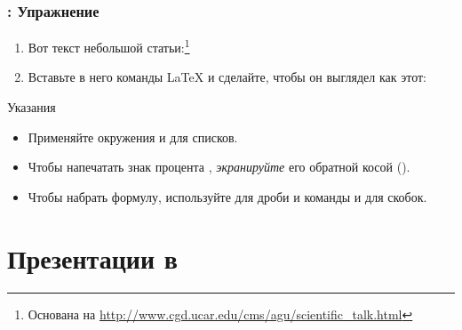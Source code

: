 \documentclass[usenames,dvipsnames]{beamer}
\begin{document}
\begin{frame}[fragile]
\frametitle{\insertsection: Упражнение}
\vspace{-3ex}
\begin{enumerate}
\item Вот текст небольшой статьи:\footnote{Основана на \url{http://www.cgd.ucar.edu/cms/agu/scientific_talk.html}}
\begin{center}
\end{center}
\item Вставьте в него команды \LaTeX{} и сделайте, чтобы он выглядел как этот:
\begin{center}
\end{center}
\end{enumerate}
\begin{tblock}{Указания}
\begin{itemize}
\item Применяйте окружения  и  для списков.
\item Чтобы напечатать знак процента \keystrokebftt{\%}, \emph{экранируйте} его обратной косой (\cmdbs{\%}).
\item Чтобы набрать формулу, используйте  для дроби и команды
   и  для скобок.
\end{itemize}
\end{tblock}
\vspace{5pt}
\end{frame}

\section{Презентации в \protect{}}
\end{document}
